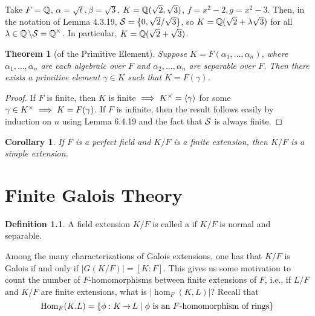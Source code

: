 \documentclass[11pt]{book}
\newcounter{counter}
\newtheorem{theorem}[counter]{Theorem}   \newtheorem*{theorem*}{Theorem}   \newtheorem{lemma}[counter]{Lemma}   \newtheorem{corollary}[counter]{Corollary}
\theoremstyle{definition}   \newtheorem{defn}[counter]{Definition} %
\newcommand{\bs}{\setminus}   \newcommand{\A}{\mathcal{A}}   \newcommand{\sy}{\textnormal{Syl}}   \newcommand{\size}[1]{\left| #1 \right|}
\newcommand{\gen}[1]{\left\langle #1 \right\rangle}   \newcommand{\stab}[2]{\tn{Stab}_{#1}(#2)}   \newcommand{\fix}[2]{\tn{Fix}_{#1}(#2)}   \newcommand{\op}{^{\tn{op}}}
\DeclareMathOperator{\ra}{\rightarrow}   \DeclareMathOperator{\Poly}{\mathbf{P}}   \DeclareMathOperator{\spn}{\textnormal{span}}   \DeclareMathOperator{\aut}{\textnormal{Aut}}
\newcommand{\vs}{\vspace{8pt}}   \newcommand{\hs}{\hspace{8pt}}
\numberwithin{counter}{chapter}
\begin{document}
\vs

\begin{example}
Take $F = \operatorname{\mathbb{Q}}$, $\alpha = \sqrt{t}, \beta = \sqrt{3}$, $K = \operatorname{\mathbb{Q}}(\sqrt{2},\sqrt{3})$, $f = x^2-2, g = x^2-3$. Then, in the notation of Lemma 4.3.19, $\mathcal{S} = \{0,\sqrt{2}/\sqrt{3}\}$, so $K = \operatorname{\mathbb{Q}}(\sqrt{2} + \lambda \sqrt{3})$ for all $\lambda \in \Q \bs \mc{S} = \Q\x$. In particular, $K = \operatorname{\mathbb{Q}}(\sqrt{2} + \sqrt{3})$. 
\end{example}

\vs

\begin{theorem}[of the Primitive Element]
Suppose $K = F(\alpha_1,\dots,\alpha_n)$, where $\alpha_1,\dots,\alpha_n$ are each algebraic over $F$ and $\alpha_2,\dots,\alpha_n$ are separable over $F$. Then there exists a primitive element $\gamma \in K$ such that $K = F(\gamma)$. 
\end{theorem}

\begin{proof}
If $F$ is finite, then $K$ is finite $\implies K\x = \gen{\gamma}$ for some $\gamma \in K^{\times} \implies K = F(\gamma)$. If $F$ is infinite, then the result follows easily by induction on $n$ using Lemma 6.4.19 and the fact that $\mathcal{S}$ is always finite. 
\end{proof}

\vs

\begin{corollary}
If $F$ is a perfect field and $K/F$ is a finite extension, then $K/F$ is a simple extension. 
\end{corollary}






\chapter{Finite Galois Theory}




\begin{defn}
A field extension $K/F$ is called a  if $K/F$ is normal and separable. 
\end{defn}

Among the many characterizations of Galois extensions, one has that $K/F$ is Galois if and only if $|G(K/F)| = [K : F]$. This gives us some motivation to count the number of $F$-homomorphisms between finite extensions of $F$, i.e., if $L/F$ and $K/F$ are finite extensions, what is $|\hom_F(K,L)|$? Recall that 
	\[\hom_F(K.L) = \{ \phi : K \ra L \mid \phi \tn{ is an }F\tn{-homomorphism of rings} \} \]
	
\end{document}
